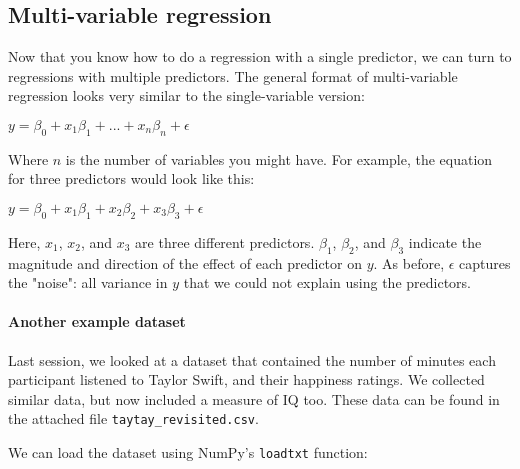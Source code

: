 \documentclass[11pt]{article}
\begin{document}
    \subsection{Multi-variable regression}\label{multi-variable-regression}

Now that you know how to do a regression with a single predictor, we can
turn to regressions with multiple predictors. The general format of
multi-variable regression looks very similar to the single-variable
version:

\(y = \beta_{0} + x_{1} \beta_{1} + ... + x_{n} \beta_{n} + \epsilon\)

Where \(n\) is the number of variables you might have. For example, the
equation for three predictors would look like this:

\(y = \beta_{0} + x_{1} \beta_{1} + x_{2} \beta_{2} + x_{3} \beta_{3} + \epsilon\)

Here, \(x_{1}\), \(x_{2}\), and \(x_{3}\) are three different
predictors. \(\beta_{1}\), \(\beta_{2}\), and \(\beta_{3}\) indicate the
magnitude and direction of the effect of each predictor on \(y\). As
before, \(\epsilon\) captures the "noise": all variance in \(y\) that we
could not explain using the predictors.

    \paragraph{Another example dataset}\label{another-example-dataset}

Last session, we looked at a dataset that contained the number of
minutes each participant listened to Taylor Swift, and their happiness
ratings. We collected similar data, but now included a measure of IQ
too. These data can be found in the attached file
\texttt{taytay\_revisited.csv}.

We can load the dataset using NumPy's \texttt{loadtxt} function:
\end{document}

